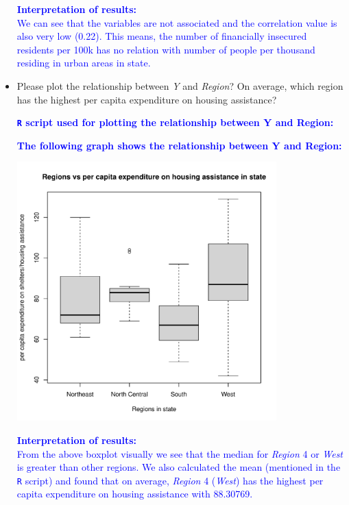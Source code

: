 \documentclass[12pt,letterpaper]{article}
\begin{document}
\begin{itemize}
\textcolor{blue}{
	\textbf{Interpretation of results:}\\
	We can see that the variables are not associated and the correlation value is also very low (0.22). This means, the number of financially insecured residents per 100k has no relation with number of people per thousand residing in urban areas in state.
}

\pagebreak

\item
Please plot the relationship between \emph{Y} and \emph{Region}? On average, which region has the highest per capita expenditure on housing assistance?
\vspace{.25cm}

\textcolor{blue}{
	\noindent \textbf{\texttt{R} script used for plotting the relationship between Y and Region:}
}

  

\textcolor{blue}{
	\noindent \textbf{The following graph shows the relationship between Y and Region:}
}
\begin{center}
	\includegraphics[width=10cm]{plot_Y_Region.pdf}  
\end{center}

\textcolor{blue}{
	\textbf{Interpretation of results:}\\
	From the above boxplot visually we see that the median for \textit{Region} 4 or \textit{West} is greater than other regions. We also calculated the mean (mentioned in the \texttt{R} script) and found that on average, \textit{Region} 4 (\textit{West}) has the highest per capita expenditure on housing assistance with 88.30769.
}


\end{itemize}
\end{document}
